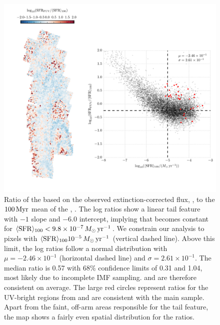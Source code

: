 \documentclass[iop, tighten]{emulateapj}
\begin{document}
\begin{figure}
\centering
\includegraphics[width=\textwidth]{m31flux-figures/sfr_fuv-vs-mean.pdf}
\caption[Ratio of the \sfr{} based on the observed extinction-corrected \fuv{}
flux to the $100\myr$ mean \sfr{}.]{Ratio of the \sfr{} based on the observed
    extinction-corrected \fuv{} flux, \sfrfuv{}, to the $100\myr$ mean of the
    \sfh{}, \sfroneh{}. The log \sfr{} ratios show a linear tail feature with
    $-1$ slope and $-6.0$ intercept, implying that \sfrfuv{} becomes constant
    for $\langle\mathrm{SFR}\rangle_{100} < 9.8\times 10^{-7}\,M_\odot\,\mathrm{yr}^{-1}$. We constrain our analysis
    to pixels with $\langle\mathrm{SFR}\rangle_{100}10^{-5}\,M_\odot\,\mathrm{yr}^{-1}$ (vertical dashed line). Above
    this limit, the log \sfr{} ratios follow a normal distribution with $\mu =
    -2.46\times 10^{-1}$ (horizontal dashed line) and $\sigma = 2.61\times
    10^{-1}$. The median ratio is 0.57 with 68\% confidence limits of 0.31 and
    1.04, most likely due to incomplete IMF sampling. \sfrfuv{} and \sfroneh{}
    are therefore consistent on average. The large red circles represent \sfr{}
    ratios for the UV-bright regions from \citet{Simones:2014} and are
    consistent with the main sample. Apart from the faint, off-arm areas
    responsible for the tail feature, the map shows a fairly even spatial
    distribution for the \sfr{} ratios.
}
\label{fig:fuvsfrratio}
\end{figure}
\end{document}
